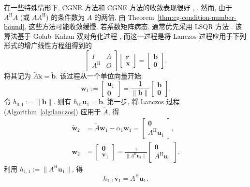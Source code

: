 {在一些特殊情形下, CGNR 方法和 CGNE 方法的收敛表现很好 , . 然而, 由于 $A^{\mathrm H}A$ (或 $AA^{\mathrm H}$) 的条件数为 $A$ 的两倍, 由 Theorem\ \ref{thm:cg-condition-number-bound}, 这些方法可能收敛缓慢.}
{若系数矩阵病态, 通常优先采用 LSQR 方法 . 该算法基于 Golub--Kahan 双对角化过程 , 而这一过程是将 Lanczos 过程应用于下列形式的增广线性方程组得到的}
\[\begin{bmatrix}I&A\\A^{\mathrm H}&O\end{bmatrix}\begin{bmatrix}\bm r\\\bm x\end{bmatrix}=\begin{bmatrix}\bm b\\\bm0\end{bmatrix}.\]
{将其记为 $\widetilde A\widetilde{\bm x}=\widetilde{\bm b}$. 该过程从一个单位向量开始:}
\[\bm w_1:=\begin{bmatrix}\bm u_1\\\bm0\end{bmatrix}=\frac1{\|\bm b\|}\begin{bmatrix}\bm b\\\bm0\end{bmatrix}.\]
{令 $h_{0,1}:=\|\bm b\|$. 则有 $h_{01}\bm u_1=\bm b$. 第一步, 将 Lanczos 过程 (Algorithm\ \ref{alg:lanczos}) 应用于 $\widetilde A$, 得}
\[\begin{aligned}\widetilde{\bm w}_2&=\widetilde A\bm w_1-\alpha_1\bm w_1=\begin{bmatrix}\bm0\\A^{\mathrm H}\bm u_1\end{bmatrix},\\
\bm w_2&=\begin{bmatrix}\bm0\\\bm v_1\end{bmatrix}=\frac1{\|A^{\mathrm H}\bm u_1\|}\begin{bmatrix}\bm0\\A^{\mathrm H}\bm u_1\end{bmatrix}.\end{aligned}\]
{利用 $h_{1,1}:=\|A^{\mathrm H}\bm u_1\|$, 得}
\begin{equation}\label{eq:golub-kahan-first-adjoint}h_{1,1}\bm v_1=A^{\mathrm H}\bm u_1.\end{equation}
